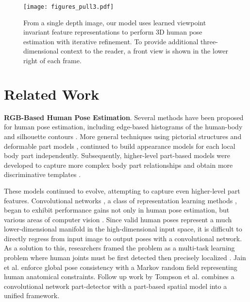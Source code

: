 \documentclass[runningheads]{llncs}
\begin{document}
	\begin{figure}[t]
		\centering
		\texttt{[image: figures\_pull3.pdf]}
		\caption[From a single depth image, our model uses learned viewpoint invariant feature representations to perform 3D human pose estimation with iterative refinement.]{From a single depth image, our model uses learned viewpoint invariant feature representations to perform 3D human pose estimation with iterative refinement. To provide additional three-dimensional context to the reader, a front view is shown in the lower right of each frame.}
		\label{fig:pull}
	\end{figure}

	\section{Related Work}\label{sec:related}

	\textbf{RGB-Based Human Pose Estimation}. Several methods have been proposed for human pose estimation, including edge-based histograms of the human-body \cite{mori2002estimating} and silhouette contours \cite{grauman2003inferring}. More general techniques using pictorial structures \cite{felzenszwalb2005pictorial,dantone2013human,eichner20122d} and deformable part models \cite{felzenszwalb2010object}, continued to build appearance models for each local body part independently. Subsequently, higher-level part-based models were developed to capture more complex body part relationships and obtain more discriminative templates \cite{pishchulin2013poselet,pishchulin2013strong,eichner2012appearance,sapp2013modec,eichner2009better}.

	These models continued to evolve, attempting to capture even higher-level part features. Convolutional networks \cite{le1990handwritten,lecun1995convolutional}, a class of representation learning methods \cite{bengio2013representation}, began to exhibit performance gains not only in human pose estimation, but various areas of computer vision \cite{krizhevsky2012imagenet}. Since valid human poses represent a much lower-dimensional manifold in the high-dimensional input space, it is difficult to directly regress from input image to output poses with a convolutional network. As a solution to this, researchers framed the problem as a multi-task learning problem where human joints must be first detected then precisely localized \cite{li2015heterogeneous,fan2015combining,li2015maximum}.
	Jain et al. \cite{jain2013learning} enforce global pose consistency with a Markov random field representing human anatomical constraints. Follow up work by Tompson et al. \cite{tompson2014joint} combines a convolutional network part-detector with a part-based spatial model into a unified framework.
\end{document}
